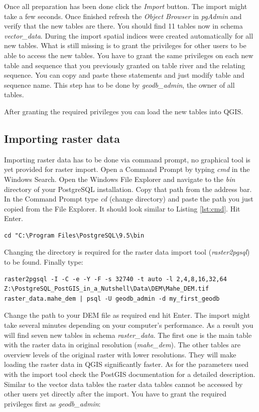 \documentclass[a4paper,12pt,titlepage]{article}
\begin{document}
Once all preparation has been done click the \textit{Import} button. The import might take a few seconds. Once finished refresh the \textit{Object Browser} in \textit{pgAdmin} and verify that the new tables are there. You should find 11 tables now in schema \textit{vector\_data}. During the import spatial indices were created automatically for all new tables. What is still missing is to grant the privileges for other users to be able to access the new tables. You have to grant the same privileges on each new table and sequence that you previously granted on table river and the relating sequence. You can copy and paste these statements and just modify table and sequence name. This step has to be done by \textit{geodb\_admin}, the owner of all tables.

After granting the required privileges you can load the new tables into QGIS.

\subsection{Importing raster data}

Importing raster data has to be done via command prompt, no graphical tool is yet provided for raster import. Open a Command Prompt by typing \textit{cmd} in the Windows Search. Open the Windows File Explorer and navigate to the \textit{bin} directory of your PostgreSQL installation. Copy that path from the address bar. In the Command Prompt type \textit{cd} (change directory) and paste the path you just copied from the File Explorer. It should look similar to Listing \ref{lst:cmd}. Hit Enter.

\begin{lstlisting}[caption={Changing directory},label=lst:cmd]
cd "C:\Program Files\PostgreSQL\9.5\bin
\end{lstlisting}

Changing the directory is required for the raster data import tool (\textit{raster2pgsql}) to be found. Finally type:

\begin{lstlisting}[caption={Importing raster data into the database}]
raster2pgsql -I -C -e -Y -F -s 32740 -t auto -l 2,4,8,16,32,64 Z:\PostgreSQL_PostGIS_in_a_Nutshell\Data\DEM\Mahe_DEM.tif raster_data.mahe_dem | psql -U geodb_admin -d my_first_geodb
\end{lstlisting}

Change the path to your DEM file as required end hit Enter. The import might take several minutes depending on your computer's performance.
As a result you will find seven new tables in schema \textit{raster\_data}. The first one is the main table with the raster data in original resolution (\textit{mahe\_dem}). The other tables are overview levels of the original raster with lower resolutions. They will make loading the raster data in QGIS significantly faster. As for the parameters used with the import tool check the PostGIS documentation for a detailed description. Similar to the vector data tables the raster data tables cannot be accessed by other users yet directly after the import. You have to grant the required privileges first as \textit{geodb\_admin}: 
\end{document}

